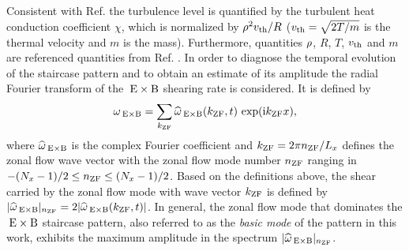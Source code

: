 Consistent with Ref.  the turbulence level is quantified by the turbulent heat conduction coefficient $\chi$, which is normalized by $\rho^2 v_{\mathrm{th}}/R$ ($v_{\mathrm{th}} = \sqrt{2 T/m}$ is the thermal velocity and $m$ is the mass). Furthermore, quantities $\rho$, $R$, $T$, $v_{\mathrm{th}}$ and $m$ are referenced quantities from Ref. .
\newpage
In order to diagnose the temporal evolution of the staircase pattern and to obtain an estimate of its amplitude the radial Fourier transform of the $\mathrm{\:E}\times\mathrm{B}$ shearing rate is considered. 
It is defined by
\begin{equation}
	\omega_{\mathrm{\:E \times B}} = \sum_{k_\mathrm{ZF}} \widehat{\omega}_{\mathrm{\:E \times B}}(k_\mathrm{ZF},t) \, \exp(\mathrm{i} k_\mathrm{ZF} x),
	\label{eq:shearingrate_fourier}
\end{equation}
where $\widehat{\omega}_{\mathrm{\:E \times B}}$ is the complex Fourier coefficient and \linebreak $k_\mathrm{ZF} = 2\pi n_\mathrm{ZF}/L_x$
defines the zonal flow wave vector with the zonal flow mode number $n_\mathrm{ZF}$ ranging in $-(N_x -1)/2 \leq n_\mathrm{ZF} \leq (N_x -1)/2 $.
Based on the definitions above, the shear carried by the zonal flow mode with wave vector $k_\mathrm{ZF}$ is defined by $|\widehat{\omega}_{\mathrm{\:E \times B}}|_{n_\mathrm{ZF}} = 2 |\widehat{\omega}_{\mathrm{\:E \times B}}(k_\mathrm{ZF},t)|$. 
In general, the zonal flow mode that dominates the $\mathrm{\:E}\times\mathrm{B}$ staircase pattern, also referred to as the \textit{basic mode} of the pattern in this work, exhibits the maximum amplitude in the spectrum $|\widehat{\omega}_{\mathrm{\:E \times B}}|_{n_\mathrm{ZF}}$.\\
